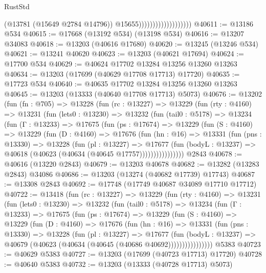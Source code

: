 \begin{lexlean}{RustStd}
\begin{coremodule}
                                          (@13781 (@15649 @2784 @14796))
                                          @15655)))))))))))))))))))
@40611 := @13186 @534
@40615 := @17668 (@13192 @534) (@13198 @534)
@40616 := @13207 @34083
@40618 := @13203 (@40616 @17680)
@40620 := @13245 (@13246 @534)
@40621 := @13241 @40620
@40623 := @13203 (@40621 @17694)
@40624 := @17700 @534
@40629 := @40624 @17702 @13284 @13256 @13260 @13263
@40634 := @13203 (@17699 (@40629 @17708 @17713) @17720)
@40635 := @17723 @534
@40640 := @40635 @17702 @13284 @13256 @13260 @13263
@40645 := @13203 (@13333 (@40640 @17708 @17713) @5073)
@40676 := @13202
    (fun (fn : @705) =>
    @13228
      (fun (rc : @13227) =>
      @13229
        (fun (rty : @4160) =>
        @13231
          (fun (lets0 : @13230) =>
          @13232
            (fun (tail0 : @5178) =>
            @13234
              (fun (Γ : @13233) =>
              @17675
                (fun (ps : @17674) =>
                @13229
                  (fun (S : @4160) =>
                  @13229
                    (fun (D : @4160) =>
                    @17676
                      (fun (hn : @16) =>
                      @13331
                        (fun (pns : @13330) =>
                        @13228
                          (fun (pl : @13227) =>
                          @17677
                            (fun (bodyL : @13237) =>
                            @40618 (@40623 (@40634 (@40645 @17757))))))))))))))))
    @2843
@40678 := @40616 (@13220 @2843)
@40679 := @13203 @40678
@40682 := @13282 (@13283 @2843) @34086
@40686 := @13203 (@13274 (@40682 @17739) @17743)
@40687 := @13308 @2843
@40692 := @17748 (@17749 @40687 @34089 @17710 @17712)
@40722 := @13418
    (fun (rc : @13227) =>
    @13229
      (fun (rty : @4160) =>
      @13231
        (fun (lets0 : @13230) =>
        @13232
          (fun (tail0 : @5178) =>
          @13234
            (fun (Γ : @13233) =>
            @17675
              (fun (ps : @17674) =>
              @13229
                (fun (S : @4160) =>
                @13229
                  (fun (D : @4160) =>
                  @17676
                    (fun (hn : @16) =>
                    @13331
                      (fun (pns : @13330) =>
                      @13228
                        (fun (pl : @13227) =>
                        @17677
                          (fun (bodyL : @13237) =>
                          @40679 (@40623 (@40634 (@40645 (@40686 @40692))))))))))))))))
    @5383
@40723 := @40629 @5383
@40727 := @13203 (@17699 (@40723 @17713) @17720)
@40728 := @40640 @5383
@40732 := @13203 (@13333 (@40728 @17713) @5073)

\end{coremodule}
\end{lexlean}
